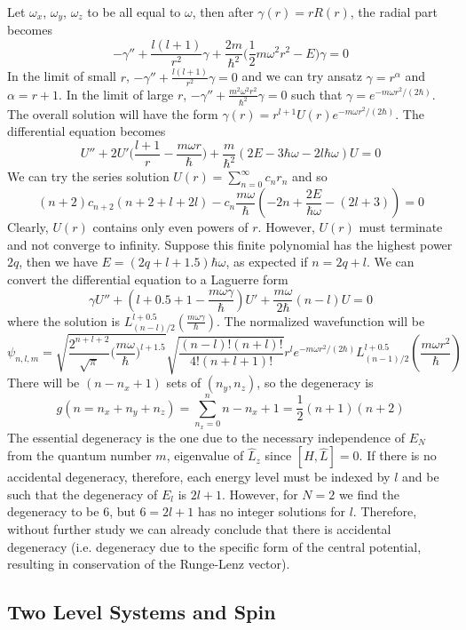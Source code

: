 \documentclass[a4paper]{article}
\begin{document}
\begin{eg}
Let $\omega_x$, $\omega_y$, $\omega_z$ to be all equal to $\omega$, then after $\gamma(r)=rR(r)$, the radial part becomes
$$-\gamma''+\frac{l(l+1)}{r^2}\gamma+\frac{2m}{\hbar^2}\bigg(\frac{1}{2}m\omega^2r^2-E\bigg)\gamma=0$$
In the limit of small $r$, $-\gamma''+\frac{l(l+1)}{r^2}\gamma=0$ and we can try ansatz $\gamma=r^\alpha$ and $\alpha=r+1$. In the limit of large $r$, $-\gamma''+\frac{m^2\omega^2r^2}{\hbar^2}\gamma=0$ such that $\gamma=e^{-m\omega r^2/(2\hbar)}$. The overall solution will have the form $\gamma(r)=r^{l+1}U(r)e^{-m\omega r^2/(2\hbar)}$. The differential equation becomes
$$U''+2U'\bigg(\frac{l+1}{r}-\frac{m\omega r}{\hbar}\bigg)+\frac{m}{\hbar^2}(2E-3\hbar\omega-2l\hbar\omega)U=0$$
We can try the series solution $U(r)=\sum_{n=0}^\infty c_nr_n$ and so
$$(n+2)c_{n+2}(n+2+l+2l)-c_n\frac{m\omega}{\hbar}(-2n+\frac{2E}{\hbar\omega}-(2l+3))=0$$
Clearly, $U(r)$ contains only even powers of $r$. However, $U(r)$ must terminate and not converge to infinity. Suppose this finite polynomial has the highest power $2q$, then we have $E=(2q+l+1.5)\hbar\omega$, as expected if $n=2q+l$. We can convert the differential equation to a Laguerre form
$$\gamma U''+(l+0.5+1-\frac{m\omega\gamma}{\hbar})U'+\frac{m\omega}{2\hbar}(n-l)U=0$$
where the solution is $L_{(n-l)/2}^{l+0.5}(\frac{m\omega\gamma}{\hbar})$. The normalized wavefunction will be
$$\psi_{n,l,m}=\sqrt{\frac{2^{n+l+2}}{\sqrt{\pi}}\bigg(\frac{m\omega}{\hbar}\bigg)^{l+1.5}}\sqrt{\frac{(n-l)!(n+l)!}{4!(n+l+1)!}}r^le^{-m\omega r^2/(2\hbar)}L_{(n-1)/2}^{l+0.5}(\frac{m\omega r^2}{\hbar})$$
There will be $(n-n_x+1)$ sets of $(n_y,n_z)$, so the degeneracy is
$$g(n=n_x+n_y+n_z)=\sum_{n_x=0}^nn-n_x+1=\frac{1}{2}(n+1)(n+2)$$
The essential degeneracy is the one due to the necessary independence of $E_N$ from the quantum number
$m$, eigenvalue of $\hat{L}_z$ since $[\hat{H},\hat{L}]=0$. If there is no accidental degeneracy, therefore, each energy level must be indexed
by $l$ and be such that the degeneracy of $E_l$ is $2l + 1$. However, for $N = 2$ we find the degeneracy to be 6, but $6=2l+1$ has no integer solutions for $l$.
Therefore, without further study we can already conclude that there is accidental degeneracy (i.e. degeneracy due to the specific form of the central potential, resulting in conservation of the Runge-Lenz vector).
\end{eg}
\newpage
\subsection{Two Level Systems and Spin}
\end{document}
